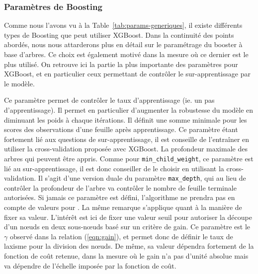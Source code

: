 \subsubsection{Paramètres de Boosting}
\label{sec:params-boosting}
Comme nous l'avons vu à la Table~\ref{tab:params-generiques}, il existe différents types de Boosting que peut utiliser XGBoost. Dans la continuité des points abordés, nous nous attarderons plus en détail sur le paramétrage du booster à base d'arbres. Ce choix est également motivé dans la mesure où ce dernier est le plus utilisé. On retrouve ici la partie la plus importante des paramètres pour XGBoost, et en particulier ceux permettant de contrôler le sur-apprentissage par le modèle.

Ce paramètre permet de contrôler le taux d'apprentissage (ie. un \og pas d'apprentissage\fg). Il permet en particulier d'augmenter la robustesse du modèle en diminuant les poids à chaque itérations.
Il définit une somme minimale pour les scores des observations d'une feuille après apprentissage. Ce paramètre étant fortement lié aux questions de sur-apprentissage, il est conseille de l'entraîner en utiliser la cross-validation proposée avec XGBoost.
La profondeur maximale des arbres qui peuvent être appris. Comme pour \texttt{min\_child\_weight}, ce paramètre est lié au sur-apprentissage, il est donc conseiller de le choisir en utilisant la cross-validation.
Il s'agit d'une version \og duale\fg{} du paramètre \texttt{max\_depth}, qui au lieu de contrôler la profondeur de l'arbre va contrôler le nombre de feuille terminale autorisées. Si jamais ce paramètre est défini, l'algorithme ne prendra pas en compte de valeurs pour . La même remarque s'applique quant à la manière de fixer sa valeur.
L'intérêt est ici de fixer une valeur seuil pour autoriser la découpe d'un n\oe uds en deux sous-n\oe uds basé sur un critère de gain. Ce paramètre est le $\gamma$ observé dans la relation (\ref{eqn:gain}), et permet donc de définir le taux de laxisme pour la division des n\oe uds. De même, sa valeur dépendra fortement de la fonction de coût retenue, dans la mesure où le gain n'a pas d'unité absolue mais va dépendre de l'échelle imposée par la fonction de coût.


